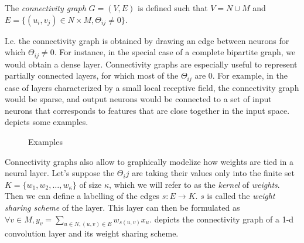 \begin{definition}
{The \emph{connectivity graph} $G = (V,E)$ is defined such that $V = N \cup M$ and $E = \{(u_i,v_j) \in  N \times M, \Theta_{ij} \neq 0 \} $.}
\end{definition}

I.e. the connectivity graph is obtained by drawing an edge between neurons for which $\Theta_{ij} \neq 0$.
For instance, in the special case of a complete bipartite graph, we would obtain a dense layer. 
Connectivity graphs are especially useful to represent partially connected layers, for which most of the $\Theta_{ij}$ are $0$. 
For example, in the case of layers characterized by a small local receptive field, the connectivity graph would be sparse, and output neurons would be connected to a set of input neurons that corresponds to features that are close together in the input space.  depicts some examples.

\begin{figure}[h]
  \begin{center}
  \end{center}
  \caption{Examples}
  \label{con_ex}
\end{figure}



Connectivity graphs also allow to graphically modelize how weights are tied in a neural layer. Let's suppose the $\Theta_ij$ are taking their values only into the finite set $K = \{w_1, w_2, \ldots, w_\kappa\}$ of size $\kappa$, which we will refer to as the \emph{kernel} of \emph{weights}. Then we can define a labelling of the edges $s: E \rightarrow K$. $s$ is called the \emph{weight sharing scheme} of the layer. This layer can then be formulated as $\displaystyle \forall v \in M, y_v = \sum_{u \in N, (u,v) \in E} w_{s(u,v)} x_u$.  depicts the connectivity graph of a 1-d convolution layer and its weight sharing scheme.

